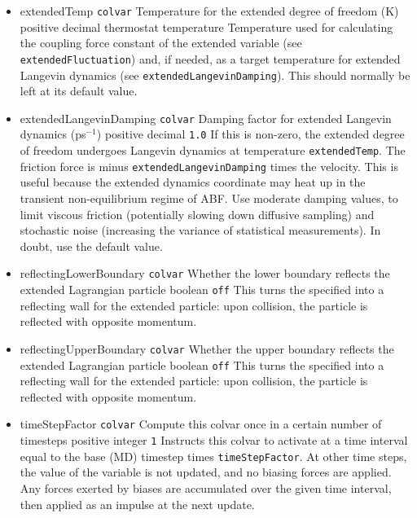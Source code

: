 \begin{itemize}
\item %
  \keydef
    {extendedTemp}{%
    \texttt{colvar}}{%
    Temperature for the extended degree of freedom (K)}{%
    positive decimal}{%
    thermostat temperature}{%
    Temperature used for calculating the coupling force constant of the
    extended variable (see \texttt{extendedFluctuation}) and, if needed, as a
    target temperature for extended Langevin dynamics (see
    \texttt{extendedLangevinDamping}). This should normally be left at its
    default value.}

\item %
  \keydef
    {extendedLangevinDamping}{%
    \texttt{colvar}}{%
    Damping factor for extended Langevin dynamics
    (ps$^{-1}$)}{%
    positive decimal}{%
    \texttt{1.0}}{%
    If this is non-zero, the extended degree of freedom undergoes Langevin dynamics
    at temperature \texttt{extendedTemp}. The friction force is minus
    \texttt{extendedLangevinDamping} times the velocity. This is useful because
    the extended dynamics coordinate may heat up in the transient
    non-equilibrium regime of ABF. Use moderate damping values, to limit
    viscous friction (potentially slowing down diffusive sampling) and stochastic
    noise (increasing the variance of statistical measurements). In
    doubt, use the default value.}

\item %
\keydef
  {reflectingLowerBoundary}{%
  \texttt{colvar}}{%
  Whether the lower boundary reflects the extended Lagrangian particle}{%
  boolean}{%
  \texttt{off}}{%
  This turns the specified  into a reflecting wall for the extended particle:
  upon collision, the particle is reflected with opposite momentum.}

\item %
\keydef
{reflectingUpperBoundary}{%
\texttt{colvar}}{%
Whether the upper boundary reflects the extended Lagrangian particle}{%
boolean}{%
\texttt{off}}{%
This turns the specified  into a reflecting wall for the extended particle:
upon collision, the particle is reflected with opposite momentum.}
\end{itemize}



\begin{itemize}

  \item %
    \keydef
      {timeStepFactor}{%
      \texttt{colvar}}{%
      Compute this colvar once in a certain number of timesteps}{%
      positive integer}{%
      \texttt{1}}{%
      Instructs this colvar to activate at a time interval equal to the base (MD)
      timestep times \texttt{timeStepFactor}.\cite{Ferrarotti2015}
      At other time steps, the value of the
      variable is not updated, and no biasing forces are applied.
      Any forces exerted by biases are accumulated over the given time interval,
      then applied as an impulse at the next update.
      }
\end{itemize}

